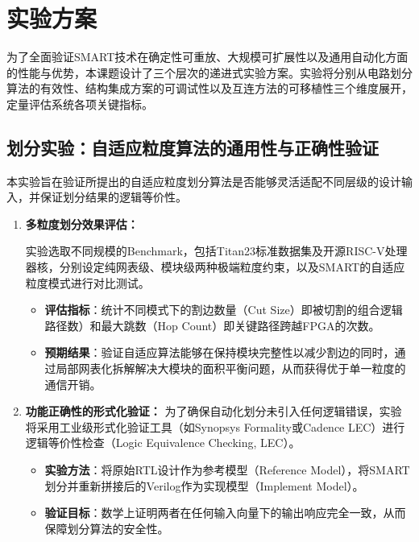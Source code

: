 \section{实验方案}

为了全面验证SMART技术在确定性可重放、大规模可扩展性以及通用自动化方面的性能与优势，本课题设计了三个层次的递进式实验方案。实验将分别从电路划分算法的有效性、结构集成方案的可调试性以及互连方法的可移植性三个维度展开，定量评估系统各项关键指标。

\subsection{划分实验：自适应粒度算法的通用性与正确性验证}

本实验旨在验证所提出的自适应粒度划分算法是否能够灵活适配不同层级的设计输入，并保证划分结果的逻辑等价性。


\begin{enumerate}

    \item \textbf{多粒度划分效果评估：}
          
          实验选取不同规模的Benchmark，包括Titan23标准数据集及开源RISC-V处理器核，分别设定纯网表级、模块级两种极端粒度约束，以及SMART的自适应粒度模式进行对比测试。
          
          \begin{itemize}
              \item \textbf{评估指标}：统计不同模式下的割边数量（Cut Size）即被切割的组合逻辑路径数）和最大跳数（Hop Count）即关键路径跨越FPGA的次数。
              \item \textbf{预期结果}：验证自适应算法能够在保持模块完整性以减少割边的同时，通过局部网表化拆解解决大模块的面积平衡问题，从而获得优于单一粒度的通信开销。
          \end{itemize}
          
    \item \textbf{功能正确性的形式化验证：}
          为了确保自动化划分未引入任何逻辑错误，实验将采用工业级形式化验证工具（如Synopsys Formality或Cadence LEC）进行逻辑等价性检查（Logic Equivalence Checking, LEC）。
          \begin{itemize}
              \item \textbf{实验方法}：将原始RTL设计作为参考模型（Reference Model），将SMART划分并重新拼接后的Verilog作为实现模型（Implement Model）。
              \item \textbf{验证目标}：数学上证明两者在任何输入向量下的输出响应完全一致，从而保障划分算法的安全性。
          \end{itemize}
          
\end{enumerate}


